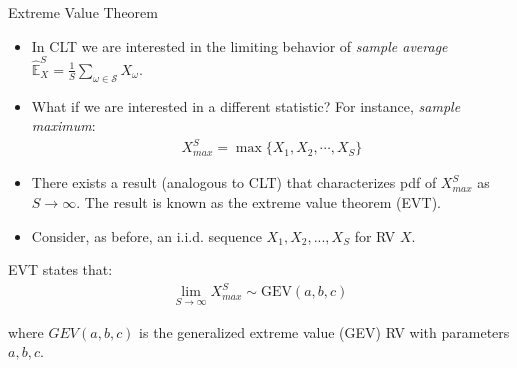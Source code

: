 \documentclass[9pt]{beamer}
\begin{document}
%
\begin{frame}{Extreme Value Theorem}

\begin{itemize}
\setlength{\itemsep}{10pt}
\item In CLT we are interested in the limiting behavior of {\em sample average} $\hat{\mathbb{E}}_X^S=\frac{1}{S}\sum_{\omega\in \mathcal{S}}X_\omega$. 

\item What if we are interested in a different statistic? For instance, {\em sample maximum}:
\begin{align*}
X_{max}^S=\max\{X_1,X_2,\cdots, X_S\}
\end{align*}

\item There exists a result (analogous to CLT) that characterizes pdf of $X_{max}^S$ as $S\to \infty$.  The result is known as the extreme value theorem (EVT).

\item Consider, as before, an i.i.d. sequence $X_1,X_2,...,X_S$ for RV $X$. 

\end{itemize}

\begin{block}{}
EVT states that:
\begin{align*}
\lim_{S\to \infty}X_{max}^S\sim \textrm{GEV}(a,b,c)
\end{align*}
\end{block}
where $GEV(a,b,c)$ is the generalized extreme value (GEV) RV with parameters $a,b,c$. 

\end{frame}
\end{document}
